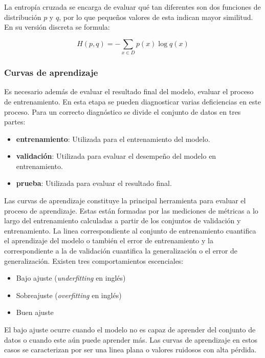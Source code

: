 La entropía cruzada se encarga de evaluar qué tan diferentes son dos funciones de distribución $p$ y $q$, por lo que
pequeños valores de esta indican mayor similitud. En su versión discreta se formula:

\begin{equation}
	H(p, q) = - \sum_{x \in D} p(x) \log q(x)
\end{equation}

\subsubsection{Curvas de aprendizaje}

Es necesario además de evaluar el resultado final del modelo, evaluar el proceso de entrenamiento. En esta etapa 
se pueden diagnosticar varias deficiencias en este proceso. Para un correcto diagnóstico se divide el conjunto de 
datos en tres partes:

\begin{itemize}
	\item \textbf{entrenamiento}: Utilizada para el entrenamiento del modelo.
	\item \textbf{validación}: Utilizada para evaluar el desempeño del modelo en entrenamiento.
	\item \textbf{prueba}: Utilizada para evaluar el resultado final.
\end{itemize}

Las curvas de aprendizaje constituye la principal herramienta para evaluar el proceso de aprendizaje.
Estas están formadas por las mediciones de métricas a lo largo del entrenamiento calculadas a partir de 
los conjuntos de validación y entrenamiento. La linea correspondiente al conjunto de entrenamiento cuantifica 
el aprendizaje del modelo o también el error de entrenamiento y la correspondiente a la de validación cuantifica 
la generalización o el error de generalización. Existen tres comportamientos escenciales:

\begin{itemize}
	\item Bajo ajuste (\emph{underfitting} en inglés)
	\item Sobreajuste (\emph{overfitting} en inglés)
	\item Buen ajuste
\end{itemize}

El bajo ajuste ocurre cuando el modelo no es capaz de aprender del conjunto de datos o cuando este aún puede aprender 
más. Las curvas de aprendizaje en estos casos se caracterizan por ser una linea plana o valores ruidosos con alta pérdida.

